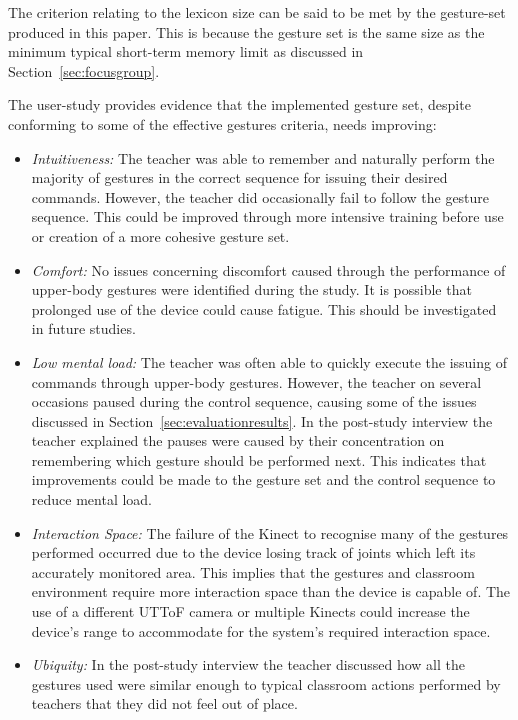 \documentclass[manuscript, review, screen]{acmart}
\begin{document}
The criterion relating to the lexicon size can be said to be met by the gesture-set produced in this paper.
This is because the gesture set is the same size as the minimum typical short-term memory limit as discussed in Section~\ref{sec:focusgroup}.

The user-study provides evidence that the implemented gesture set, despite conforming to some of the effective gestures criteria, needs improving:

\begin{itemize}
\item \textit{{Intuitiveness:}}  The teacher was able to remember and naturally perform the majority of gestures in the correct sequence for issuing their desired commands.
However, the teacher did occasionally fail to follow the gesture sequence.
This could be improved through more intensive training before use or creation of a more cohesive gesture set.
\item \textit{{Comfort:}}  No issues concerning discomfort caused through the performance of upper-body gestures were identified during the study.
It is possible that prolonged use of the device could cause fatigue.
This should be investigated in future studies.
\item \textit{{Low mental load:}}  The teacher was often able to quickly execute the issuing of commands through upper-body gestures.
However, the teacher on several occasions paused during the control sequence, causing some of the issues discussed in Section~\ref{sec:evaluationresults}.
In the post-study interview the teacher explained the pauses were caused by their concentration on remembering which gesture should be performed next.
This indicates that improvements could be made to the gesture set and the control sequence to reduce mental load.
\item \textit{{Interaction Space:}} The failure of the Kinect to recognise many of the gestures performed occurred due to the device losing track of joints which left its accurately monitored area.
This implies that the gestures and classroom environment require more interaction space than the device is capable of.
The use of a different \ac{UTToF} camera or multiple Kinects could increase the device's range to accommodate for the system's required interaction space.
\item \textit{{Ubiquity:}} In the post-study interview the teacher discussed how all the gestures used were similar enough to typical classroom actions performed by teachers that they did not feel out of place.\\ 
\end{itemize}
\end{document}
